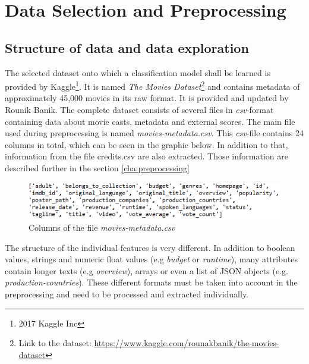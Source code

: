\chapter{Data Selection and Preprocessing}
\label{cha:data_selection}

\section{Structure of data and data exploration}
\label{sec:data_exploration}
The selected dataset onto which a classification model shall be learned is provided by Kaggle\footnote{2017 Kaggle Inc}. It is named \textit{The Movies Dataset}\footnote{Link to the dataset: \hyperref[https://www.kaggle.com/rounakbanik/the-movies-dataset]{https://www.kaggle.com/rounakbanik/the-movies-dataset}} and contains metadata of approximately 45,000 movies in its raw format. It is provided and updated by Rounik Banik. The complete dataset consists of several files in \textit{csv}-format containing data about movie casts, metadata and external scores. The main file used during preprocessing is named \textit{movies-metadata.csv}. This \textit{csv}-file contains 24 columns in total, which can be seen in the graphic below. In addition to that, information from the file credits.csv are also extracted. Those information are described further in the section \ref{cha:preprocessing} 
\begin{figure}[ht]
	\centering
		\includegraphics[width=\textwidth]{images/Raw_dataset_headers.png}
	\caption{Columns of the file \textit{movies-metadata.csv}}
\end{figure}


The structure of the individual features is very different. In addition to boolean values, strings and numeric float values (e.g \textit{budget} or \textit{runtime}), many attributes contain longer texts (e.g \textit{overview}), arrays or even a list of JSON objects (e.g. \textit{production-countries}). These different formats must be taken into account in the preprocessing and need to be processed and extracted individually.

